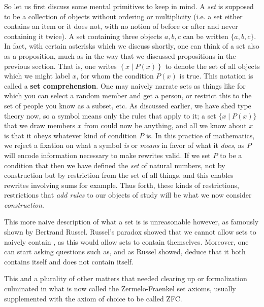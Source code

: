\documentclass[11pt]{article}
\begin{document}
So let us first discuss some mental primitives to keep in mind. A \emph{set} is supposed to be a collection of objects without ordering or multiplicity (i.e. a set either contains an item or it does not, with no notion of before or after and never containing it twice). A set containing three objects $a,b,c$ can be written $\{a,b,c\}$. In fact, with certain asterisks which we discuss shortly, one can think of a set also as a proposition, much as in the way that we discussed propositions in the previous section. That is, one writes $\left\{x  \mid P(x) \right\}$ to denote the set of all objects which we might label $x$, for whom the condition $P(x)$ is true. This notation is called a \textbf{set comprehension}. One may naively narrate sets as things like  for which you can select a random member and get a person, or restrict this to the set of people you know as a subset, etc. As discussed earlier, we have shed type theory now, so a symbol means only the rules that apply to it; a set $\{x \mid P(x) \}$ that we draw members $x$ from could now be anything, and all we know about $x$ is that it obeys whatever kind of condition $P$ is. In this practice of mathematics, we reject a fixation on what a symbol \emph{is} or \emph{means} in favor of what it \emph{does}, as $P$ will encode information necessary to make rewrites valid. If we set $P$ to be a condition that  then we have defined the \emph{set} of natural numbers, not by construction but by restriction from the set of all things, and this enables rewrites involving sums for example. Thus forth, these kinds of restrictions, restrictions that \emph{add rules} to our objects of study will be what we now consider \emph{construction}. 

This more naive description of what a set is is unreasonable however, as famously shown by Bertrand Russel. Russel's paradox showed that we cannot allow sets to naively contain , as this would allow sets to contain themselves. Moreover, one can start asking questions such as,  and as Russel showed, deduce that it both contains itself and does not contain itself.

This and a plurality of other matters that needed clearing up or formalization culminated in what is now called the Zermelo-Fraenkel set axioms, usually supplemented with the axiom of choice to be called ZFC.
\end{document}
